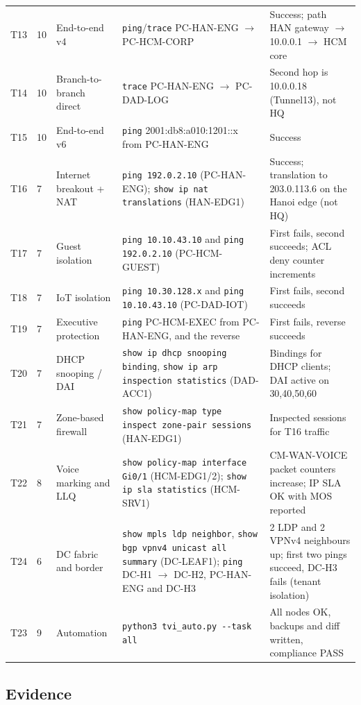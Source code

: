 \documentclass[11pt,a4paper]{article}
\begin{document}
{\begin{longtable}{@{}p{0.8cm}p{0.7cm}p{3.3cm}p{4.6cm}p{5.4cm}@{}}
T13 & 10 & End-to-end v4 & \texttt{ping}/\texttt{trace} PC-HAN-ENG $\rightarrow$ PC-HCM-CORP & Success; path HAN gateway $\rightarrow$ 10.0.0.1 $\rightarrow$ HCM core\\
T14 & 10 & Branch-to-branch direct & \texttt{trace} PC-HAN-ENG $\rightarrow$ PC-DAD-LOG & Second hop is 10.0.0.18 (Tunnel13), not HQ\\
T15 & 10 & End-to-end v6 & \texttt{ping} 2001:db8:a010:1201::x from PC-HAN-ENG & Success\\
T16 & 7 & Internet breakout + NAT & \texttt{ping 192.0.2.10} (PC-HAN-ENG); \texttt{show ip nat translations} (HAN-EDG1) & Success; translation to 203.0.113.6 on the Hanoi edge (not HQ)\\
T17 & 7 & Guest isolation & \texttt{ping 10.10.43.10} and \texttt{ping 192.0.2.10} (PC-HCM-GUEST) & First fails, second succeeds; ACL deny counter increments\\
T18 & 7 & IoT isolation & \texttt{ping 10.30.128.x} and \texttt{ping 10.10.43.10} (PC-DAD-IOT) & First fails, second succeeds\\
T19 & 7 & Executive protection & \texttt{ping} PC-HCM-EXEC from PC-HAN-ENG, and the reverse & First fails, reverse succeeds\\
T20 & 7 & DHCP snooping / DAI & \texttt{show ip dhcp snooping binding}, \texttt{show ip arp inspection statistics} (DAD-ACC1) & Bindings for DHCP clients; DAI active on 30,40,50,60\\
T21 & 7 & Zone-based firewall & \texttt{show policy-map type inspect zone-pair sessions} (HAN-EDG1) & Inspected sessions for T16 traffic\\
T22 & 8 & Voice marking and LLQ & \texttt{show policy-map interface Gi0/1} (HCM-EDG1/2); \texttt{show ip sla statistics} (HCM-SRV1) & CM-WAN-VOICE packet counters increase; IP SLA OK with MOS reported\\
T24 & 6 & DC fabric and border & \texttt{show mpls ldp neighbor}, \texttt{show bgp vpnv4 unicast all summary} (DC-LEAF1); \texttt{ping} DC-H1 $\rightarrow$ DC-H2, PC-HAN-ENG and DC-H3 & 2 LDP and 2 VPNv4 neighbours up; first two pings succeed, DC-H3 fails (tenant isolation)\\
T23 & 9 & Automation & \texttt{python3 tvi\_auto.py -{}-task all} & All nodes OK, backups and diff written, compliance PASS\\
\bottomrule
\end{longtable}}

\subsection{Evidence}
\end{document}
